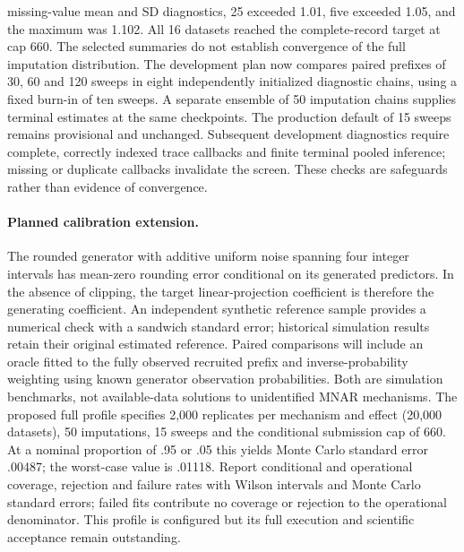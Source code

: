 \documentclass[11pt,a4paper]{article}
\begin{document}
missing-value mean and SD diagnostics, 25 exceeded 1.01, five exceeded 1.05, and the maximum was 1.102. All 16 datasets reached the complete-record target at cap 660. The selected summaries do not establish convergence of the full imputation distribution. The development plan now compares paired prefixes of 30, 60 and 120 sweeps in eight independently initialized diagnostic chains, using a fixed burn-in of ten sweeps. A separate ensemble of 50 imputation chains supplies terminal estimates at the same checkpoints. The production default of 15 sweeps remains provisional and unchanged. Subsequent development diagnostics require complete, correctly indexed trace callbacks and finite terminal pooled inference; missing or duplicate callbacks invalidate the screen. These checks are safeguards rather than evidence of convergence.

\paragraph{Planned calibration extension.}
The rounded generator with additive uniform noise spanning four integer intervals has mean-zero rounding error conditional on its generated predictors. In the absence of clipping, the target linear-projection coefficient is therefore the generating coefficient. An independent synthetic reference sample provides a numerical check with a sandwich standard error; historical simulation results retain their original estimated reference. Paired comparisons will include an oracle fitted to the fully observed recruited prefix and inverse-probability weighting using known generator observation probabilities. Both are simulation benchmarks, not available-data solutions to unidentified MNAR mechanisms. The proposed full profile specifies 2,000 replicates per mechanism and effect (20,000 datasets), 50 imputations, 15 sweeps and the conditional submission cap of 660. At a nominal proportion of .95 or .05 this yields Monte Carlo standard error .00487; the worst-case value is .01118. Report conditional and operational coverage, rejection and failure rates with Wilson intervals and Monte Carlo standard errors; failed fits contribute no coverage or rejection to the operational denominator. This profile is configured but its full execution and scientific acceptance remain outstanding.
\end{document}
